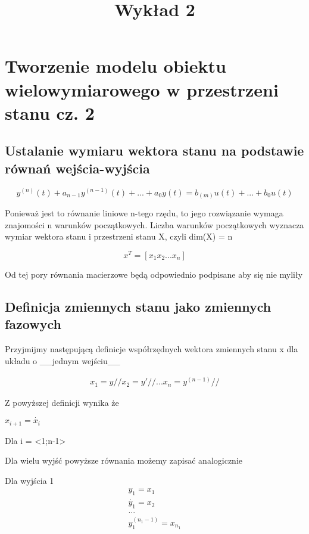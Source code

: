 \documentclass{article}
\title{Wykład 2}
\begin{document}
	\section{Tworzenie modelu obiektu wielowymiarowego w przestrzeni stanu cz. 2}
	\subsection{Ustalanie wymiaru wektora stanu na podstawie równań wejścia-wyjścia}

		\begin{equation}
			y^{(n)}(t) + a_{n-1} y^{(n-1)}(t) + ... +   a_{0} y(t) = b_{(m)} u(t) + ... + b_{0} u(t)
		\end{equation}

		Ponieważ jest to równanie liniowe n-tego rzędu, to jego rozwiązanie wymaga znajomości
		n warunków początkowych. Liczba warunków początkowych wyznacza wymiar wektora stanu
		i przestrzeni stanu X, czyli dim(X) = n

		\begin{equation}
			x^{T} = [ x_{1} x_{2} ... x_{n} ]
		\end{equation}

		Od tej pory równania macierzowe będą odpowiednio podpisane aby się nie myliły

	\subsection{Definicja zmiennych stanu jako zmiennych fazowych}

		Przyjmijmy następującą definicje współrzędnych wektora zmiennych stanu x
		dla układu o __jednym wejściu__
		
		\begin{equation}
			\begin{aligned}
				 x_{1} = y //
				 x_{2} = y' //
				...
				 x_{n} = y^{(n-1)} //
			\end{aligned}
		\end{equation}

		Z powyższej definicji wynika że

		$ x_{i+1} = \dot{x_{i}} $

		Dla i = <1;n-1>

		Dla wielu wyjść powyższe równania możemy zapisać analogicznie

		Dla wyjścia 1
		\begin{equation}
			\begin{aligned}

				 y_{1} = x_{1} \\
				 \dot{y_{1}} = x_{2} \\
				... \\
				 y_{1}^{(n_{1}-1)} = x_{n_{1}}

			\end{aligned}
		\end{equation}
\end{document}
